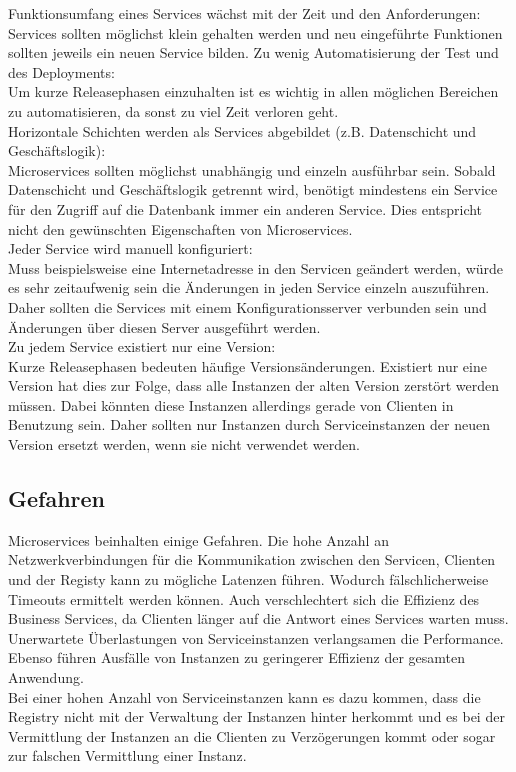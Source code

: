 Funktionsumfang eines Services wächst mit der Zeit und den Anforderungen:\\
Services sollten möglichst klein gehalten werden und neu eingeführte Funktionen sollten jeweils ein neuen Service bilden.
Zu wenig Automatisierung der Test und des Deployments:\\
Um kurze Releasephasen einzuhalten ist es wichtig in allen möglichen Bereichen zu automatisieren, da sonst zu viel Zeit verloren geht.\\
Horizontale Schichten werden als Services abgebildet (z.B. Datenschicht und Geschäftslogik):\\
Microservices sollten möglichst unabhängig und einzeln ausführbar sein. Sobald Datenschicht und Geschäftslogik getrennt wird, benötigt mindestens ein Service für den Zugriff auf die Datenbank immer ein anderen Service. Dies entspricht nicht den gewünschten Eigenschaften von Microservices.\\
Jeder Service wird manuell konfiguriert:\\
Muss beispielsweise eine Internetadresse in den Servicen geändert werden, würde es sehr zeitaufwenig sein die Änderungen in jeden Service einzeln auszuführen. Daher sollten die Services mit einem Konfigurationsserver verbunden sein und Änderungen über diesen Server ausgeführt werden.\\
Zu jedem Service existiert nur eine Version:\\
Kurze Releasephasen bedeuten häufige Versionsänderungen. Existiert nur eine Version hat dies zur Folge, dass alle Instanzen der alten Version zerstört werden müssen. Dabei könnten diese Instanzen allerdings gerade von Clienten in Benutzung sein. Daher sollten nur Instanzen durch Serviceinstanzen der neuen Version ersetzt werden, wenn sie nicht verwendet werden.\\




\subsection{Gefahren}

Microservices beinhalten einige Gefahren. Die hohe Anzahl an Netzwerkverbindungen für die Kommunikation zwischen den Servicen, Clienten und der Registy kann zu mögliche Latenzen führen. Wodurch fälschlicherweise Timeouts ermittelt werden können. Auch verschlechtert sich die Effizienz des Business Services, da Clienten länger auf die Antwort eines Services warten muss.\\
Unerwartete Überlastungen von Serviceinstanzen verlangsamen die Performance. Ebenso führen Ausfälle von Instanzen zu geringerer Effizienz der gesamten Anwendung.\\
Bei einer hohen Anzahl von Serviceinstanzen kann es dazu kommen, dass die Registry nicht mit der Verwaltung der Instanzen hinter herkommt und es bei der Vermittlung der Instanzen an die Clienten zu Verzögerungen kommt oder sogar zur falschen Vermittlung einer Instanz.

